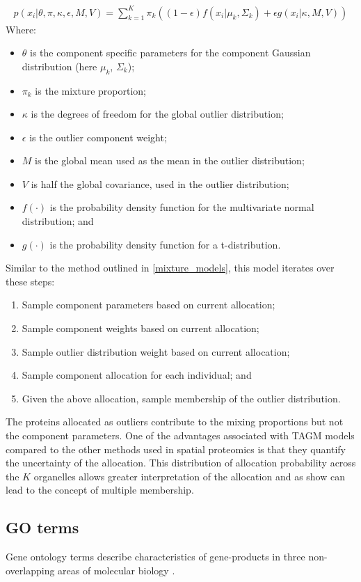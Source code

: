 \documentclass[11pt]{article} %
\begin{document}
\begin{align} \label{tagm_model}
p(x_i | \theta, \pi, \kappa, \epsilon, M, V) = \sum_{k=1}^K\pi_k((1 - \epsilon) f(x_i|\mu_k,\Sigma_k) + \epsilon g(x_i |\kappa, M, V))
\end{align}
Where:
\begin{itemize}
 \item $\theta$ is the component specific parameters for the component Gaussian distribution (here $\mu_k$, $\Sigma_k$);
 \item $\pi_k$ is the mixture proportion;
 \item $\kappa$ is the degrees of freedom for the global outlier distribution;
 \item $\epsilon$ is the outlier component weight;
 \item $M$ is the global mean used as the mean in the outlier distribution;
 \item $V$ is half the global covariance, used in the outlier distribution;
 \item $f(\cdot)$ is the probability density function for the multivariate normal distribution; and 
 \item $g(\cdot)$ is the probability density function for a t-distribution.
\end{itemize}
Similar to the method outlined in \ref{mixture_models}, this model iterates over these steps:
\begin{enumerate}
 \item Sample component parameters based on current allocation;
 \item Sample component weights based on current allocation;
 \item Sample outlier distribution weight based on current allocation;
 \item Sample component allocation for each individual; and
 \item Given the above allocation, sample membership of the outlier distribution.
\end{enumerate}
The proteins allocated as outliers contribute to the mixing proportions but not the component parameters. One of the advantages associated with TAGM models compared to the other methods used in spatial proteomics is that they quantify the uncertainty of the allocation. This distribution of allocation probability across the $K$ organelles allows greater interpretation of the allocation and as \citet{CrookBayesianMixtureModelling2018a} show can lead to the concept of multiple membership.

\subsection{GO terms}
Gene ontology terms describe characteristics of gene-products in three non-overlapping areas of molecular biology \cite{GeneOntologyConsortiumGeneOntologyGO2004}.
\end{document}
